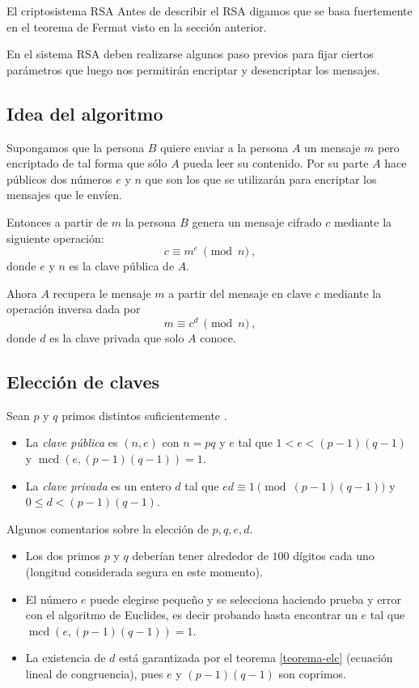 \begin{section}{El criptosistema RSA}
Antes de describir el RSA digamos que se basa fuertemente en el teorema de Fermat visto en la sección anterior. 


En el sistema RSA deben realizarse algunos paso previos para fijar ciertos parámetros que luego nos permitirán encriptar y desencriptar los mensajes.



\subsection*{Idea del  algoritmo}

Supongamos que la persona $B$  quiere enviar a la persona $A$ un mensaje $m$ pero encriptado de tal forma que sólo $A$ pueda leer su contenido. Por su parte $A$ hace públicos dos números $e$ y $n$ que son los que se utilizarán para encriptar los mensajes que le envíen. 

Entonces a partir de $m$ la persona $B$ genera un mensaje cifrado $c$ mediante la siguiente ope\-ra\-ción:
$$
    c\equiv m^e\ \pmod{n}\ ,
$$
donde $e$ y $n$ es la clave pública de $A$.

Ahora $A$ recupera le mensaje $m$ a partir del mensaje en clave $c$ mediante la operación inversa dada por
$$
    m\equiv c^d\ \pmod{n}\ ,
$$
donde $d$ es la clave privada que solo $A$ conoce.




\subsection*{Elección de claves}



Sean  $p$ y $q$ primos distintos suficientemente . 
\begin{itemize}
    \item  La \emph{clave pública} es $(n, e)$ con $n = pq$ y $e$ tal que $1 < e < (p-1)(q-1)$ y $\operatorname{mcd}(e, (p-1)(q-1)) = 1$. 
    \item  La \emph{clave privada} es un entero $d$ tal que $ed \equiv 1 \pmod{(p-1)(q-1)}$ y $0 \le d <(p-1)(q-1)$.
\end{itemize}


\begin{observacion*} Algunos comentarios sobre la elección de $p,q,e,d$.
\begin{itemize}
\item
Los dos primos $p$ y $q$ deberían tener alrededor de $100$ dígitos cada uno (longitud considerada segura en este momento).
\item
El número $e$ puede elegirse pequeño y se selecciona haciendo prueba y error con el algoritmo de Euclides, es decir probando hasta encontrar un $e$ tal que $\operatorname{mcd}(e, (p-1)(q-1)) = 1$.
\item
La existencia de $d$ está garantizada por el teorema \ref{teorema-elc} (ecuación lineal de congruencia), pues $e$ y $(p-1)(q-1)$ son coprimos.
\end{itemize}


\end{observacion*}
\end{section}
